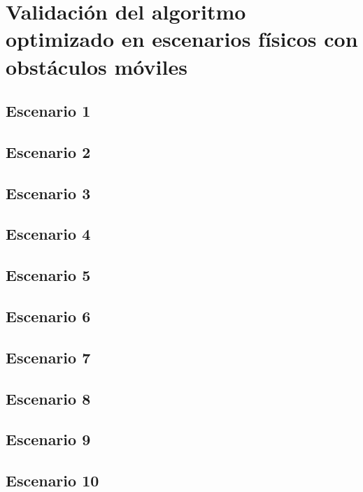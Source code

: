\chapter{Validación del algoritmo optimizado en escenarios físicos con obstáculos móviles}\label{cap:validacion}

\newpage
\section{Escenario 1}

\newpage
\section{Escenario 2}

\newpage
\section{Escenario 3}

\newpage
\section{Escenario 4}

\newpage
\section{Escenario 5}

\newpage
\section{Escenario 6}

\newpage
\section{Escenario 7}

\newpage
\section{Escenario 8}

\newpage
\section{Escenario 9}

\newpage
\section{Escenario 10}







